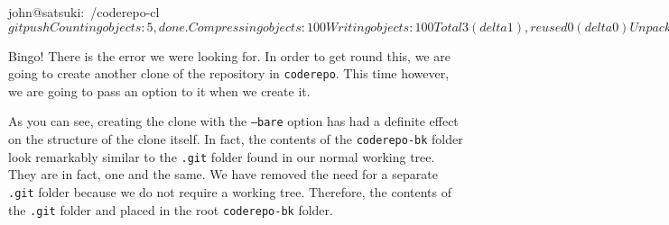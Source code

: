 \begin{code}
john@satsuki:~/coderepo-cl$ git push
Counting objects: 5, done.
Compressing objects: 100%
Writing objects: 100%
Total 3 (delta 1), reused 0 (delta 0)
Unpacking objects: 100%
remote: error: refusing to update checked out branch: refs/heads/wonderful
remote: error: By default, updating the current branch in a non-bare repository
remote: error: is denied, because it will make the index and work tree inconsistent
remote: error: with what you pushed, and will require 'git reset --hard' to match
remote: error: the work tree to HEAD.
remote: error:
remote: error: You can set 'receive.denyCurrentBranch' configuration variable to
remote: error: 'ignore' or 'warn' in the remote repository to allow pushing into 
remote: error: its current branch; however, this is not recommended unless you 
remote: error: arranged to update its work tree to match what you pushed in some
remote: error:  other way.
remote: error:
remote: error: To squelch this message and still keep the default behaviour, set
remote: error: 'receive.denyCurrentBranch' configuration
remote: error: variable to 'refuse'.
To /home/john/coderepo
 ! [remote rejected] wonderful -> wonderful (branch is currently checked out)
error: failed to push some refs to '/home/john/coderepo'
john@satsuki:~/coderepo-cl$
\end{code}

Bingo! There is the error we were looking for.
In order to get round this, we are going to create another clone of the repository in \texttt{coderepo}.
This time however, we are going to pass an option to it when we create it.


As you can see, creating the clone with the \texttt{--bare} option has had a definite effect on the structure of the clone itself.
In fact, the contents of the \texttt{coderepo-bk} folder look remarkably similar to the \texttt{.git} folder found in our normal working tree.
They are in fact, one and the same.
We have removed the need for a separate \texttt{.git} folder because we do not require a working tree.
Therefore, the contents of the \texttt{.git} folder and placed in the root \texttt{coderepo-bk} folder.

